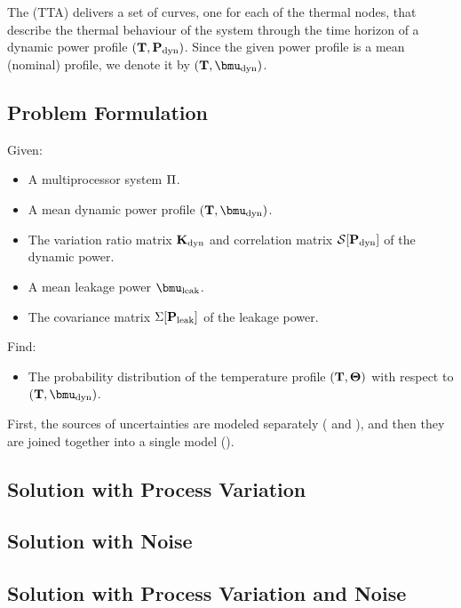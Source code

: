 The  (TTA) delivers a set of curves, one for each of the thermal nodes, that describe the thermal behaviour of the system through the time horizon of a dynamic power profile $(\mathbf{T}, \mathbf{P}_{\text{dyn}})$. Since the given power profile is a mean (nominal) profile, we denote it by $\mpprofile{\dyn}$.

\subsection{Problem Formulation}
Given:
\begin{itemize}
  \item A multiprocessor system $\Pi$.
  \item A mean dynamic power profile $\mpprofile{\dyn}$.
  \item The variation ratio matrix $\mathbf{K}_{\text{dyn}}$ and correlation matrix $\mathcal{S}[{\mathbf{P}_{\text{dyn}}}]$ of the dynamic power.
  \item A mean leakage power $\vmean{\leak}$.
  \item The covariance matrix $\Sigma[\mathbf{P}_{\text{leak}}]$ of the leakage power.
\end{itemize}

Find:
\begin{itemize}
  \item The probability distribution of the temperature profile $(\mathbf{T}, \mathbf{\Theta})$ with respect to $\mpprofile{\dyn}$.
\end{itemize}

First, the sources of uncertainties are modeled separately ( and ), and then they are joined together into a single model ().

\subsection{Solution with Process Variation} 


\subsection{Solution with Noise} 


\subsection{Solution with Process Variation and Noise} 

